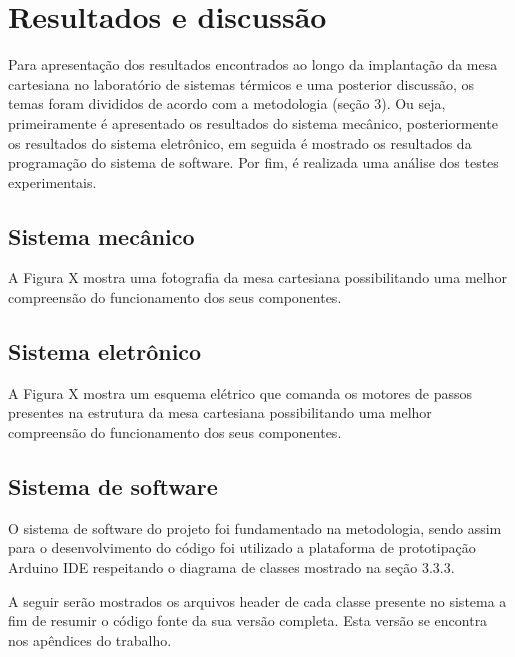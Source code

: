 \chapter{Resultados e discussão}
\label{chap:resultados}

Para apresentação dos resultados encontrados ao longo da implantação da mesa cartesiana no 
laboratório de sistemas térmicos e uma posterior discussão, os temas foram divididos de acordo 
com a metodologia (seção 3). Ou seja, primeiramente é apresentado os resultados do sistema mecânico, 
posteriormente os resultados do sistema eletrônico, em seguida é mostrado os resultados da programação 
do sistema de software. Por fim, é realizada uma análise dos testes experimentais.

\section{Sistema mecânico}\label{sec:resmecanico}

A Figura X mostra uma fotografia da mesa cartesiana possibilitando uma melhor compreensão do funcionamento 
dos seus componentes.

%
%

\section{Sistema eletrônico}\label{sec:ressisele}

A Figura X mostra um esquema elétrico que comanda os motores de passos presentes na estrutura  da mesa 
cartesiana possibilitando uma melhor compreensão do funcionamento dos seus componentes.

%
%


\section{Sistema de software}\label{sec:ressissof}

O sistema de software do projeto foi fundamentado na metodologia, sendo assim para o desenvolvimento 
do código foi utilizado a plataforma de prototipação Arduino IDE respeitando o diagrama de classes 
mostrado na seção 3.3.3.

A seguir serão mostrados os arquivos header de cada classe presente no sistema a fim de resumir 
o código fonte da sua versão completa. Esta versão se encontra nos apêndices do trabalho.

